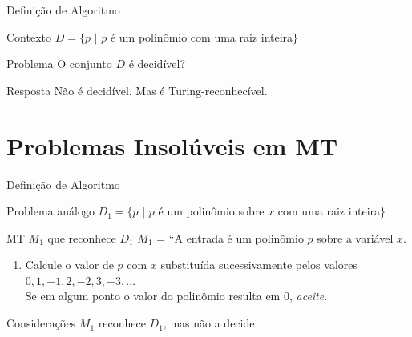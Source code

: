 \documentclass[xcolor=dvipsnames,table]{beamer}
\begin{document}
	\begin{frame}{Definição de Algoritmo}
		\begin{block}{Contexto}
			$D = \{ p \mbox{ | } p$ é um polinômio com uma raiz inteira$\}$
		\end{block}  
		\begin{block}{Problema}
			O conjunto $D$ é decidível?
		\end{block}  
		\begin{block}{Resposta}
			Não é decidível. Mas é Turing-reconhecível.
		\end{block}
	\end{frame}

	\section{Problemas Insolúveis em MT}
	
	\begin{frame}{Definição de Algoritmo}
		\begin{block}{Problema análogo}
			$D_1 = \{p \mbox{ | } p$ é um polinômio sobre $x$ com uma raiz inteira$\}$
		\end{block} \pause
		\begin{block}{MT $M_1$ que reconhece $D_1$}
			$M_1$ = ``A entrada é um polinômio $p$ sobre a variável $x$.
			\begin{enumerate}
				\item Calcule o valor de $p$ com $x$ substituída sucessivamente pelos valores $0, 1,-1, 2, -2, 3, -3, \ldots$ \\Se em algum ponto o valor do polinômio resulta em $0$, {\it aceite}.
			\end{enumerate}
		\end{block}\pause
		\begin{block}{Considerações}
			$M_1$ reconhece $D_1$, mas não a decide.
		\end{block}
	\end{frame} 
	
\end{document}

